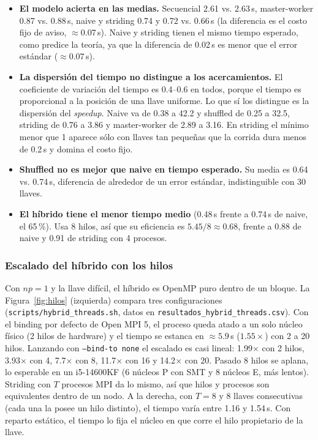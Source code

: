 \documentclass[11pt,letterpaper]{article}
\begin{document}
\begin{itemize}
    \item \textbf{El modelo acierta en las medias.} Secuencial 2.61 vs. 2.63\,s, master-worker 0.87 vs. 0.88\,s, naive y striding 0.74 y 0.72 vs. 0.66\,s (la diferencia es el costo fijo de aviso, $\approx0.07$\,s). Naive y striding tienen el mismo tiempo esperado, como predice la teoría, ya que la diferencia de 0.02\,s es menor que el error estándar ($\approx0.07$\,s).
    \item \textbf{La dispersión del tiempo no distingue a los acercamientos.} El coeficiente de variación del tiempo es 0.4--0.6 en todos, porque el tiempo es proporcional a la posición de una llave uniforme. Lo que sí los distingue es la dispersión del \textit{speedup}. Naive va de 0.38 a 42.2 y shuffled de 0.25 a 32.5, striding de 0.76 a 3.86 y master-worker de 2.89 a 3.16. En striding el mínimo menor que 1 aparece sólo con llaves tan pequeñas que la corrida dura menos de 0.2\,s y domina el costo fijo.
    \item \textbf{Shuffled no es mejor que naive en tiempo esperado.} Su media es 0.64 vs. 0.74\,s, diferencia de alrededor de un error estándar, indistinguible con 30 llaves.
    \item \textbf{El híbrido tiene el menor tiempo medio} (0.48\,s frente a 0.74\,s de naive, el 65\,\%). Usa 8 hilos, así que su eficiencia es $5.45/8\approx0.68$, frente a 0.88 de naive y 0.91 de striding con 4 procesos.
\end{itemize}

\subsubsection*{Escalado del híbrido con los hilos}
\label{sec:hilos}

Con $np=1$ y la llave difícil, el híbrido es OpenMP puro dentro de un bloque. La
Figura~\ref{fig:hilos} (izquierda) compara tres configuraciones
(\texttt{scripts/hybrid\_threads.sh}, datos en \texttt{resultados\_hybrid\_threads.csv}).
Con el binding por defecto de Open MPI 5, el proceso queda atado a un solo núcleo
físico (2 hilos de hardware) y el tiempo se estanca en $\approx5.9$\,s ($1.55\times$)
con 2 a 20 hilos. Lanzando con \texttt{--bind-to none} el escalado es casi lineal:
1.99$\times$ con 2 hilos, 3.93$\times$ con 4, 7.7$\times$ con 8, 11.7$\times$ con 16 y
14.2$\times$ con 20. Pasado 8 hilos se aplana, lo esperable en un i5-14600KF (6 núcleos
P con SMT y 8 núcleos E, más lentos). Striding con $T$ procesos MPI da lo mismo, así que
hilos y procesos son equivalentes dentro de un nodo. A la derecha, con $T=8$ y 8 llaves
consecutivas (cada una la posee un hilo distinto), el tiempo varía entre 1.16 y
1.54\,s. Con reparto estático, el tiempo lo fija el núcleo en que corre el hilo
propietario de la llave.
\end{document}
